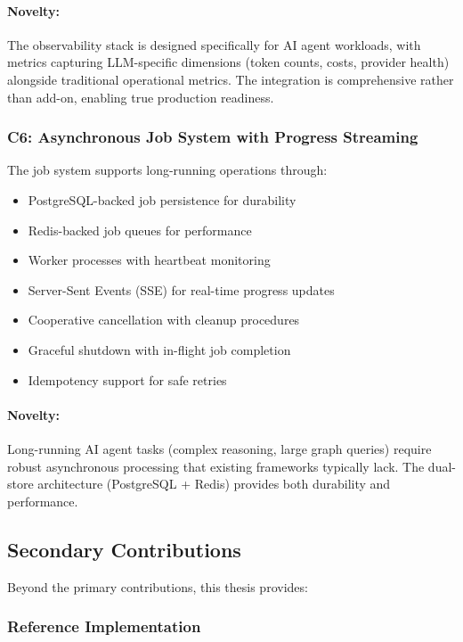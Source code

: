 \paragraph{Novelty:} The observability stack is designed specifically for AI agent workloads, with metrics capturing LLM-specific dimensions (token counts, costs, provider health) alongside traditional operational metrics. The integration is comprehensive rather than add-on, enabling true production readiness.

\subsubsection{C6: Asynchronous Job System with Progress Streaming}

The job system supports long-running operations through:

\begin{itemize}
    \item PostgreSQL-backed job persistence for durability
    \item Redis-backed job queues for performance
    \item Worker processes with heartbeat monitoring
    \item Server-Sent Events (SSE) for real-time progress updates
    \item Cooperative cancellation with cleanup procedures
    \item Graceful shutdown with in-flight job completion
    \item Idempotency support for safe retries
\end{itemize}

\paragraph{Novelty:} Long-running AI agent tasks (complex reasoning, large graph queries) require robust asynchronous processing that existing frameworks typically lack. The dual-store architecture (PostgreSQL + Redis) provides both durability and performance.

\subsection{Secondary Contributions}

Beyond the primary contributions, this thesis provides:

\subsubsection{Reference Implementation}

